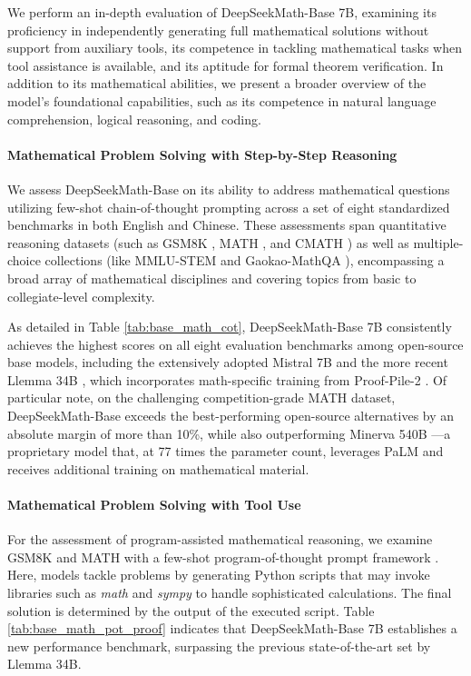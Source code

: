 \begin{itemize}[topsep=0pt]
We perform an in-depth evaluation of DeepSeekMath-Base 7B, examining its proficiency in independently generating full mathematical solutions without support from auxiliary tools, its competence in tackling mathematical tasks when tool assistance is available, and its aptitude for formal theorem verification. In addition to its mathematical abilities, we present a broader overview of the model's foundational capabilities, such as its competence in natural language comprehension, logical reasoning, and coding.

\paragraph{Mathematical Problem Solving with Step-by-Step Reasoning}

We assess DeepSeekMath-Base on its ability to address mathematical questions utilizing few-shot chain-of-thought prompting \citep{cot} across a set of eight standardized benchmarks in both English and Chinese. These assessments span quantitative reasoning datasets (such as GSM8K \citep{gsm8k}, MATH \citep{MATH}, and CMATH \citep{wei2023cmath}) as well as multiple-choice collections (like MMLU-STEM \citep{mmlu} and Gaokao-MathQA \citep{agieval}), encompassing a broad array of mathematical disciplines and covering topics from basic to collegiate-level complexity.

As detailed in Table \ref{tab:base_math_cot}, DeepSeekMath-Base 7B consistently achieves the highest scores on all eight evaluation benchmarks among open-source base models, including the extensively adopted Mistral 7B \citep{mistral} and the more recent Llemma 34B \citep{llemma}, which incorporates math-specific training from Proof-Pile-2 \citep{llemma}. Of particular note, on the challenging competition-grade MATH dataset, DeepSeekMath-Base exceeds the best-performing open-source alternatives by an absolute margin of more than 10\%, while also outperforming Minerva 540B \citep{minerva}—a proprietary model that, at 77 times the parameter count, leverages PaLM \citep{palm} and receives additional training on mathematical material.

\paragraph{Mathematical Problem Solving with Tool Use} For the assessment of program-assisted mathematical reasoning, we examine GSM8K and MATH with a few-shot program-of-thought prompt framework \citep{pot,pal}. Here, models tackle problems by generating Python scripts that may invoke libraries such as \textit{math} and \textit{sympy} to handle sophisticated calculations. The final solution is determined by the output of the executed script. Table \ref{tab:base_math_pot_proof} indicates that DeepSeekMath-Base 7B establishes a new performance benchmark, surpassing the previous state-of-the-art set by Llemma 34B.


\end{itemize}
